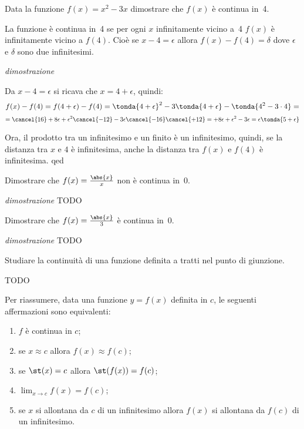 \begin{esempio}
 Data la funzione \(f(x)=x^2-3x\) dimostrare che \(f(x)\) è continua in~4.
 
 La funzione è continua in~4 se per ogni \(x\) infinitamente vicino a~4 
 \(f(x)\) è infinitamente vicino a \(f(4)\). Cioè se \(x -4=\epsilon\) allora
 \(f(x) -f(4) = \delta\) dove \(\epsilon\) e \(\delta\) sono due infinitesimi.
 
\emph{dimostrazione}

Da \(x-4=\epsilon\) si ricava che \(x=4+\epsilon\), quindi: 
\[f(x) -f(4) = f(4+\epsilon) -f(4) = 
\tonda{4+\epsilon}^2-3\tonda{4+\epsilon}-\tonda{4^2-3\cdot 4}=\]
\[=\cancel{16}+8\epsilon+\epsilon^2\cancel{-12} 
  -3\epsilon\cancel{-16}\cancel{+12} = 
  +8\epsilon+\epsilon^2 -3\epsilon = 
\epsilon \tonda{5 + \epsilon}\]

Ora, il prodotto tra un infinitesimo e un finito è un infinitesimo, quindi, se 
la distanza tra \(x\) e \(4\) è infinitesima, anche la distanza tra 
\(f(x)\) e \(f(4)\) è infinitesima. qed 
 
\end{esempio}

\begin{esempio}
 Dimostrare che \(f(x)=\frac{\abs{x}}{x}\) non è continua in~0.
 
\emph{dimostrazione}
TODO
 
\end{esempio}

\begin{esempio}
 Dimostrare che \(f(x)=\frac{\abs{x}}{3}\) è continua in~0.
 
\emph{dimostrazione}
TODO
 
\end{esempio}

\begin{esempio}
 Studiare la continuità di una funzione definita a tratti nel punto di 
giunzione.
 
TODO
 
\end{esempio}

Per riassumere, data una funzione \(y=f(x)\) definita in \(c\), le seguenti 
affermazioni sono equivalenti:

\begin{enumerate}[noitemsep]
 \item \(f\) è continua in \(c\);
 \item se \(x \approx c\) allora \(f(x) \approx f(c)\);
 \item se \(\st(x) = c\) allora \(\st(f(x)) = f(c)\);
 \item \(\lim_{x \to c} f(x) = f(c)\);
 \item se \(x\) si allontana da \(c\) di un infinitesimo allora 
 \(f(x)\) si allontana da \(f(c)\) di un infinitesimo.
\end{enumerate}

